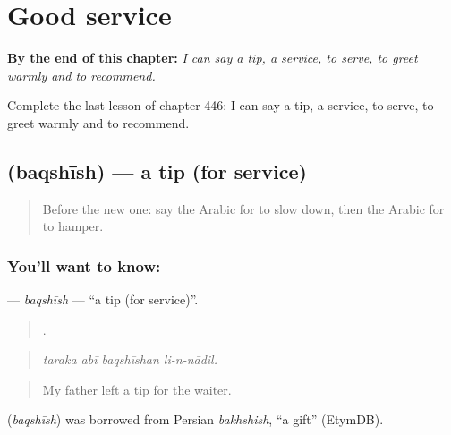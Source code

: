 
\chapter{Good service}
\label{ch:ar-good-service}

\begin{chapteropening}
\textbf{By the end of this chapter:} \emph{I can say a tip, a service, to serve, to greet warmly and to recommend.}

Complete the last lesson of chapter 446: I can say a tip, a service, to serve, to greet warmly and to recommend.
\end{chapteropening}

\section[\texorpdfstring{\ar{بقشيش} (baqshīsh)}{بقشيش (baqshīsh)}]{ (baqshīsh) — a tip (for service)}

\label{lesson:AR-C446-baqshish}



\begin{quote}
Before the new one: say the Arabic for to slow down, then the Arabic for to hamper.
\end{quote}

\subsection*{You'll want to know: }
\textbf{} — \emph{baqshīsh} — \textquotedblleft{}a tip (for service)\textquotedblright{}.

\begin{quote}
   .
\end{quote}

\begin{quote}
\emph{taraka abī baqshīshan li-n-nādil.}
\end{quote}

\begin{quote}
My father left a tip for the waiter.
\end{quote}

\begin{cousinweb}
\textbf{} (\emph{baqshīsh}) was borrowed from Persian \emph{bakhshish}, \textquotedblleft{}a gift\textquotedblright{} (EtymDB).
\end{cousinweb}

